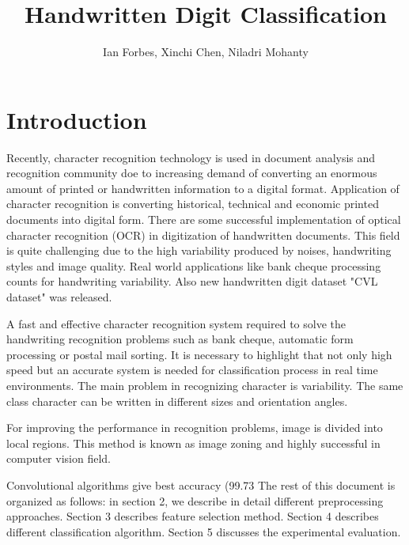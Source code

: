 \documentclass[10pt,twocolumn]{article}
\title{Handwritten Digit Classification}
\author{Ian Forbes, Xinchi Chen, Niladri Mohanty}
\begin{document}
\section{Introduction}
Recently, character recognition technology is used in document analysis and recognition community doe to increasing demand of converting an enormous amount of printed or handwritten information to a digital format. Application of character recognition is converting historical, technical and economic printed documents into digital form. There are some successful implementation of optical character recognition (OCR) in digitization of handwritten documents. This field is quite challenging due to the high variability produced by noises, handwriting styles and image quality. Real world applications like bank cheque processing counts for handwriting variability. \cite {diem2013icdar} Also new handwritten digit dataset "CVL dataset" was released. 

\cite {liu2003handwritten} A fast and effective character recognition system required to solve the handwriting recognition problems such as bank cheque, automatic form processing or postal mail sorting. It is necessary to highlight that not only high speed but an accurate system is needed for classification process in real time environments. The main problem in recognizing character is variability. The same class character can be written in different sizes and orientation angles.

For improving the performance in recognition problems, image is divided into local regions. \cite {lazebnik2006beyond} This method is known as image zoning and highly successful in computer vision field.

\cite {ciresan2012multi} Convolutional algorithms give best accuracy (99.73%
The rest of this document is organized as follows: in section 2, we describe in detail different preprocessing approaches. Section 3 describes feature selection method. Section 4 describes different classification algorithm. Section 5 discusses the experimental evaluation.
\end{document}

